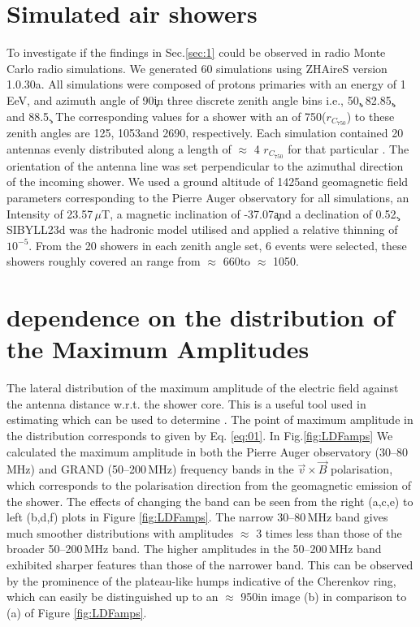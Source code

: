 \section{Simulated air showers}\label{sec:sims}
To investigate if the findings in Sec.\ref{sec:1} could be observed in radio Monte Carlo radio simulations. We generated 60 simulations using  ZHAireS \cite{ZHAireS} version 1.0.30a. All simulations were composed of protons primaries with an energy of 1 EeV, and azimuth angle of 90\c in three discrete zenith angle bins i.e., 50\c, 82.85\c, and 88.5\c. The corresponding \rc values for a shower with an \xmax of 750\gr ($r_{C_{750}}$) to these zenith angles are 125\m, 1053\m  and 2690\m, respectively. Each simulation contained 20 antennas evenly distributed along a length of $\approx$ 4 $r_{C_{750}}$ for that particular \thet. The orientation of the antenna line was set perpendicular to the azimuthal direction of the incoming shower. We used a ground altitude of 1425\m and geomagnetic field parameters corresponding to the Pierre Auger observatory for all simulations, \ie an Intensity of 23.57$\,\mu$T, a magnetic inclination of -37.07\c and a declination of 0.52\c. SIBYLL23d \cite{Riehn2020} was the hadronic model utilised and applied a  relative thinning of $10^{-5}$. From the 20 showers in each zenith angle set, 6 events were selected, these showers roughly covered an \xmax range from $\approx$ 660\gr to $\approx$ 1050\gr.

\section{\xmax dependence on the distribution of the Maximum Amplitudes}
\label{sec:ldf}
The lateral distribution of the maximum amplitude of the electric field against the antenna distance w.r.t. the shower core. This is a useful tool used in estimating \rc which can be used to determine \xmax \cite{LOFARNATURE}. The point of maximum amplitude in the distribution corresponds to \rc given by Eq. \ref{eq:01}. In Fig.\ref{fig:LDFamps} We calculated the maximum amplitude in both the Pierre Auger observatory  (30--80\,MHz)\cite{2018JCAP...10..026A}  and GRAND (50--200\,MHz)\cite{2020SCPMA..6319501A}  frequency bands in the $\vec{v} \times \vec{B}$ polarisation, which corresponds to the polarisation direction from the geomagnetic emission of the shower. The effects of changing the band can be seen from the right (a,c,e) to left (b,d,f) plots in Figure \ref{fig:LDFamps}. The narrow 30--80\,MHz band gives much smoother distributions with amplitudes $\approx$ 3 times less than those of the broader 50--200\,MHz band. The higher amplitudes in the 50--200\,MHz band exhibited sharper features than those of the narrower band. This can be observed by the prominence of the plateau-like humps indicative of the Cherenkov ring, which can easily be distinguished up to an \xmax $\approx$ 950\gr in image (b) in comparison to (a) of Figure \ref{fig:LDFamps}.


